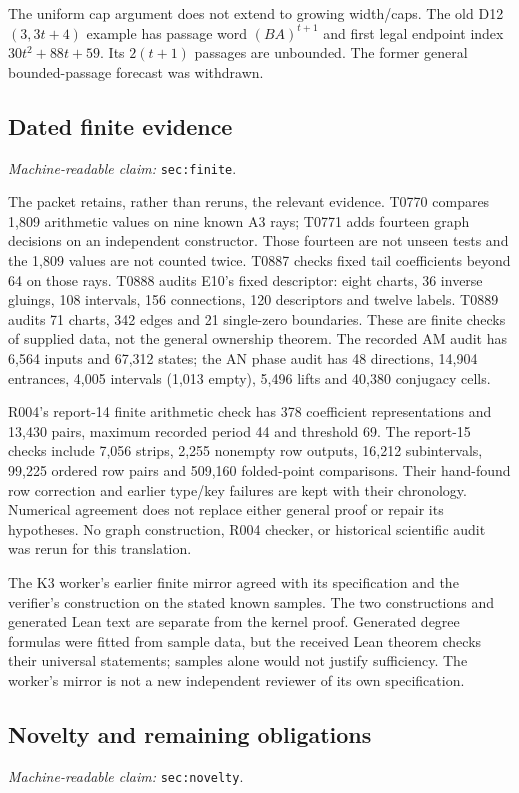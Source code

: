 \documentclass[11pt]{amsart}
\newcommand{\record}[1]{\nolinkurl{#1}}
\newcommand{\claimid}[1]{\par\nopagebreak\noindent\textit{Machine-readable claim:} \record{#1}.\par}
\theoremstyle{definition}\newtheorem{definition}{Definition}
\begin{document}
The uniform cap argument does not extend to growing width/caps.
The old D12$(3,3t+4)$ example has passage word $(BA)^{t+1}$ and first
legal endpoint index $30t^2+88t+59$. Its $2(t+1)$ passages are unbounded.
The former general bounded-passage forecast was withdrawn.

\subsection{Dated finite evidence}\label{sec:finite}
\claimid{sec:finite}
The packet retains, rather than reruns, the relevant evidence.
T0770 compares 1,809 arithmetic values on nine known A3 rays;
T0771 adds fourteen graph decisions on an independent constructor.
Those fourteen are not unseen tests and the 1,809 values are not counted
twice. T0887 checks fixed tail coefficients beyond 64 on those rays.
T0888 audits E10's fixed descriptor: eight charts, 36 inverse gluings,
108 intervals, 156 connections, 120 descriptors and twelve labels.
T0889 audits 71 charts, 342 edges and 21 single-zero boundaries.
These are finite checks of supplied data, not the general ownership
theorem. The recorded AM audit has 6,564 inputs and 67,312 states;
the AN phase audit has 48 directions, 14,904 entrances, 4,005 intervals
(1,013 empty), 5,496 lifts and 40,380 conjugacy cells.

R004's report-14 finite arithmetic check has 378 coefficient
representations and 13,430 pairs, maximum recorded period 44 and
threshold 69. The report-15 checks include 7,056 strips, 2,255 nonempty
row outputs, 16,212 subintervals, 99,225 ordered row pairs and 509,160
folded-point comparisons. Their hand-found row correction and earlier
type/key failures are kept with their chronology. Numerical agreement
does not replace either general proof or repair its hypotheses.
No graph construction, R004 checker, or historical scientific audit
was rerun for this translation.

The K3 worker's earlier finite mirror agreed with its specification
and the verifier's construction on the stated known samples. The two
constructions and generated Lean text are separate from the kernel
proof. Generated degree formulas were fitted from sample data, but the
received Lean theorem checks their universal statements; samples alone
would not justify sufficiency. The worker's mirror is not a new
independent reviewer of its own specification.

\subsection{Novelty and remaining obligations}\label{sec:novelty}
\claimid{sec:novelty}
\end{document}
